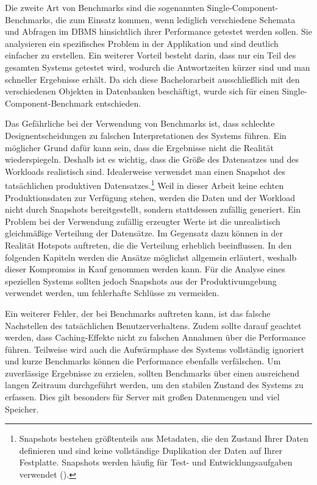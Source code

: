 Die zweite Art von Benchmarks sind die sogenannten Single-Component-Benchmarks, die zum Einsatz kommen, wenn lediglich verschiedene Schemata und Abfragen im DBMS hinsichtlich ihrer Performance getestet werden sollen.
Sie analysieren ein spezifisches Problem in der Applikation und sind deutlich einfacher zu erstellen.
Ein weiterer Vorteil besteht darin, dass nur ein Teil des gesamten Systems getestet wird, wodurch die Antwortzeiten kürzer sind und man schneller Ergebnisse erhält.
Da sich diese Bachelorarbeit ausschließlich mit den verschiedenen Objekten in Datenbanken beschäftigt, wurde sich für einen Single-Component-Benchmark entschieden.

Das Gefährliche bei der Verwendung von Benchmarks ist, dass schlechte Designentscheidungen zu falschen Interpretationen des Systems führen.
Ein möglicher Grund dafür kann sein, dass die Ergebnisse nicht die Realität wiederspiegeln.
Deshalb ist es wichtig, dass die Größe des Datensatzes und des Workloads realistisch sind.
Idealerweise verwendet man einen Snapshot des tatsächlichen produktiven Datensatzes.\footnote{Snapshots bestehen größtenteils aus Metadaten, die den Zustand Ihrer Daten definieren und sind keine vollständige Duplikation der Daten auf Ihrer Festplatte. Snapshots werden häufig für Test- und Entwicklungsaufgaben verwendet (\cite{snapshot}).}
Weil in dieser Arbeit keine echten Produktionsdaten zur Verfügung stehen, werden die Daten und der Workload nicht durch Snapshots bereitgestellt, sondern stattdessen zufällig generiert.
Ein Problem bei der Verwendung zufällig erzeugter Werte ist die unrealistisch gleichmäßige Verteilung der Datensätze.
Im Gegensatz dazu können in der Realität Hotspots auftreten, die die Verteilung erheblich beeinflussen.
In den folgenden Kapiteln werden die Ansätze möglichst allgemein erläutert, weshalb dieser Kompromiss in Kauf genommen werden kann.
Für die Analyse eines speziellen Systems sollten jedoch Snapshots aus der Produktivumgebung verwendet werden, um fehlerhafte Schlüsse zu vermeiden.

Ein weiterer Fehler, der bei Benchmarks auftreten kann, ist das falsche Nachstellen des tatsächlichen Benutzerverhaltens.
Zudem sollte darauf geachtet werden, dass Caching-Effekte nicht zu falschen Annahmen über die Performance führen.
Teilweise wird auch die Aufwärmphase des Systems vollständig ignoriert und kurze Benchmarks können die Performance ebenfalls verfälschen.
Um zuverlässige Ergebnisse zu erzielen, sollten Benchmarks über einen ausreichend langen Zeitraum durchgeführt werden, um den stabilen Zustand des Systems zu erfassen.
Dies gilt besonders für Server mit großen Datenmengen und viel Speicher.

